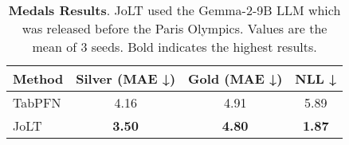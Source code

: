 \begin{table}[t]
\vspace{-2mm}
  \centering
  \caption{\textbf{Medals Results}. JoLT used the Gemma-2-9B LLM which was released before the Paris Olympics. Values are the mean of 3 seeds. Bold indicates the highest results.}
  \label{tab:multi_column_medals}%
  \begin{small}
  \begin{sc}
  \begin{adjustbox}{max width=\columnwidth}
    \begin{tabular}{lccc}
    \toprule
    Method & \multicolumn{1}{p{9.3em}}{\centering Silver (MAE ↓)} & \multicolumn{1}{p{6.6em}}{\centering Gold (MAE ↓)} & \multicolumn{1}{p{4.2em}}{\centering NLL ↓} \\
    \midrule
    TabPFN & 4.16  & 4.91  & 5.89 \\
    JoLT  & \textbf{3.50} & \textbf{4.80} & \textbf{1.87} \\
    \bottomrule
    \end{tabular}%
    \end{adjustbox}
    \end{sc}
    \end{small}
\vspace{-5mm}
\end{table}%
